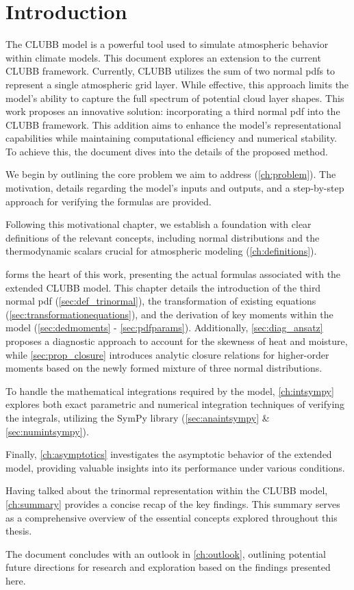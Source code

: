 \chapter{Introduction}\label{ch:introduction}

The \gls{CLUBB} model is a powerful tool used to simulate atmospheric behavior within climate models.
This document explores an extension to the current \gls{CLUBB} framework.
Currently, \gls{CLUBB} utilizes the sum of two normal \glspl{pdf}
to represent a single atmospheric grid layer.
While effective,
this approach limits the model's ability to capture the full spectrum of potential cloud layer shapes.
This work proposes an innovative solution:
incorporating a third normal \gls{pdf} into the \gls{CLUBB} framework.
This addition aims to enhance the model's representational capabilities
while maintaining computational efficiency and numerical stability.
To achieve this, the document dives into the details of the proposed method.

We begin by outlining the core problem we aim to address (\cref{ch:problem}).
The motivation, details regarding the model's inputs and outputs,
and a step-by-step approach for verifying the formulas are provided.

Following this motivational chapter,
we establish a foundation with clear definitions of the relevant concepts,
including normal distributions and the thermodynamic scalars
crucial for atmospheric modeling (\cref{ch:definitions}).

 forms the heart of this work,
presenting the actual formulas associated with the extended \gls{CLUBB} model.
This chapter details the introduction of the third normal \gls{pdf} (\cref{sec:def_trinormal}),
the transformation of existing equations (\cref{sec:transformationequations}),
and the derivation of key moments within the model (\cref{sec:dedmoments} - \cref{sec:pdfparams}).
Additionally,
\cref{sec:diag_ansatz} proposes a diagnostic approach
to account for the skewness of heat and moisture,
while \cref{sec:prop_closure} introduces analytic closure relations
for higher-order moments based on the newly formed mixture of three normal distributions.

To handle the mathematical integrations required by the model,
\cref{ch:intsympy} explores both exact parametric
and numerical integration techniques of verifying the integrals,
utilizing the SymPy library (\cref{sec:anaintsympy} \& \cref{sec:numintsympy}).

Finally,
\cref{ch:asymptotics} investigates the asymptotic behavior of the extended model,
providing valuable insights into its performance under various conditions.

Having talked about the trinormal representation within the \gls{CLUBB} model,
\cref{ch:summary} provides a concise recap of the key findings.
This summary serves as a comprehensive overview of the essential concepts
explored throughout this thesis.

The document concludes with an outlook in \cref{ch:outlook},
outlining potential future directions for research
and exploration based on the findings presented here.
